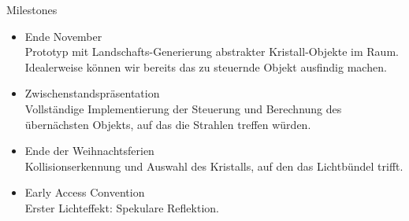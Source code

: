 \begin{frame}{Milestones}
	\begin{itemize}
		
		

		\item \textcolor{evap@lightgreen}{Ende November\\
			Prototyp mit Landschafts-Generierung abstrakter \glqq Kristall\grqq -Objekte im Raum. Idealerweise können wir bereits das zu steuernde Objekt ausfindig machen.}
			
		\item \textcolor{evap@yellow}{Zwischenstandspräsentation\\
			Vollständige Implementierung der Steuerung und Berechnung des übernächsten Objekts, auf das die Strahlen treffen würden.}
			
		\item Ende der Weihnachtsferien\\
			Kollisionserkennung und Auswahl des Kristalls, auf den das Lichtbündel trifft.
		\item Early Access Convention\\
			Erster Lichteffekt: Spekulare Reflektion.
	\end{itemize}
\end{frame}

%

